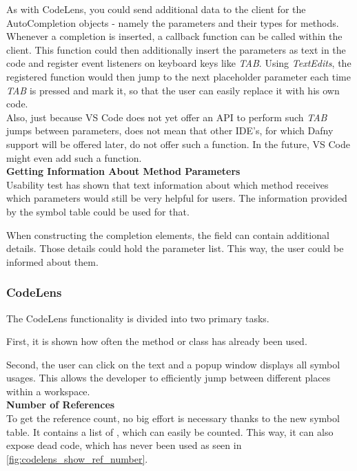 As with CodeLens, you could send additional data to the client
for the AutoCompletion objects - namely the parameters and their types for methods.
Whenever a completion is inserted, a callback function can be called within the client.
This function could then additionally insert the parameters as text in the code and register
event listeners on keyboard keys like \textit{TAB}.
Using \textit{TextEdits}, the registered function would then jump to the next placeholder parameter
each time \textit{TAB} is pressed and mark it, so that the user can easily replace it with his own code. \\

Also, just because VS Code does not yet offer an API to perform such \textit{TAB} jumps between parameters,
does not mean that other IDE's, for which Dafny support will be offered later,
do not offer such a function.
In the future, VS Code might even add such a function. \\

\textbf{Getting Information About Method Parameters} \\
Usability test has shown that text information about which method
receives which parameters would still be very helpful for users.
The information provided by the symbol table could be used for that.

When constructing the completion elements,
the field  can contain additional details.
Those details could hold the parameter list.
This way, the user could be informed about them.\\


\subsubsection{CodeLens}
The CodeLens functionality is divided into two primary tasks.

First, it is shown how often the method or class has already been used.

Second, the user can click on the text and a popup window displays all symbol usages.
This allows the developer to efficiently jump between different places within a workspace.\\

\textbf{Number of References} \\
To get the reference count, no big effort is necessary thanks to the new symbol table.
It contains a list of , which can easily be counted.
This way, it can also expose dead code, which has never been used as seen in \ref{fig:codelens_show_ref_number}. \\

